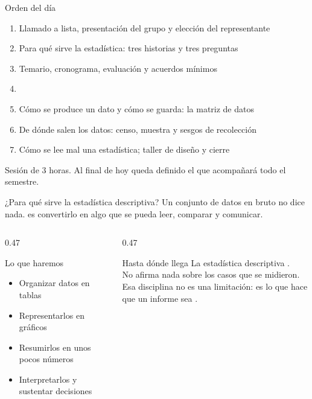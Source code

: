 \documentclass[aspectratio=169,10pt]{beamer}
\begin{document}
\portada

\begin{frame}{Orden del día}
  \begin{enumerate}
    \item Llamado a lista, presentación del grupo y elección del representante
    \item Para qué sirve la estadística: tres historias y tres preguntas
    \item Temario, cronograma, evaluación y acuerdos mínimos
    \item {}
    \item Cómo se produce un dato y cómo se guarda: la matriz de datos
    \item De dónde salen los datos: censo, muestra y sesgos de recolección
    \item Cómo se lee mal una estadística; taller de diseño y cierre
  \end{enumerate}

  \vspace{0.25cm}
  {\footnotesize\color{uniGris} Sesión de 3 horas. Al final de hoy queda
  definido el  que acompañará todo el semestre.}
\end{frame}

\begin{frame}{¿Para qué sirve la estadística descriptiva?}
  Un conjunto de datos en bruto no dice nada.  es
  convertirlo en algo que se pueda leer, comparar y comunicar.

  \vspace{0.3cm}
  \begin{columns}[T,onlytextwidth]
    \begin{column}{0.47\textwidth}
      \begin{block}{Lo que haremos}
        \footnotesize
        \begin{itemize}
          \item Organizar datos en tablas
          \item Representarlos en gráficos
          \item Resumirlos en unos pocos números
          \item Interpretarlos y sustentar decisiones
        \end{itemize}
      \end{block}
    \end{column}
    \begin{column}{0.47\textwidth}
      \begin{exampleblock}{Hasta dónde llega}
        \footnotesize
        La estadística descriptiva .\\[0.3em]
        No afirma nada sobre los casos que  se midieron.\\[0.3em]
        Esa disciplina no es una limitación: es lo que hace que un informe sea
        .
      \end{exampleblock}
    \end{column}
  \end{columns}
\end{frame}
\end{document}
